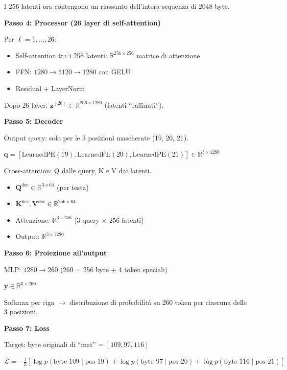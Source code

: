 \documentclass[12pt,a4paper]{article}
\begin{document}
\begin{examplebox}
I 256 latenti ora contengono un riassunto dell'intera sequenza di 2048 byte.

\textbf{Passo 4: Processor (26 layer di self-attention)}

Per $\ell = 1, \ldots, 26$:
\begin{itemize}
    \item Self-attention tra i 256 latenti: $\mathbb{R}^{256 \times 256}$ matrice di attenzione
    \item FFN: $1280 \to 5120 \to 1280$ con GELU
    \item Residual + LayerNorm
\end{itemize}

Dopo 26 layer: $\mathbf{z}^{(26)} \in \mathbb{R}^{256 \times 1280}$ (latenti ``raffinati'').

\textbf{Passo 5: Decoder}

Output query: solo per le 3 posizioni mascherate (19, 20, 21).

$\mathbf{q} = [\text{LearnedPE}(19), \text{LearnedPE}(20), \text{LearnedPE}(21)] \in \mathbb{R}^{3 \times 1280}$

Cross-attention: Q dalle query, K e V dai latenti.
\begin{itemize}
    \item $\mathbf{Q}^{\text{dec}} \in \mathbb{R}^{3 \times 64}$ (per testa)
    \item $\mathbf{K}^{\text{dec}}, \mathbf{V}^{\text{dec}} \in \mathbb{R}^{256 \times 64}$
    \item Attenzione: $\mathbb{R}^{3 \times 256}$ (3 query $\times$ 256 latenti)
    \item Output: $\mathbb{R}^{3 \times 1280}$
\end{itemize}

\textbf{Passo 6: Proiezione all'output}

MLP: $1280 \to 260$ (260 = 256 byte + 4 token speciali)

$\mathbf{y} \in \mathbb{R}^{3 \times 260}$

Softmax per riga $\to$ distribuzione di probabilit\`a su 260 token per ciascuna delle 3 posizioni.

\textbf{Passo 7: Loss}

Target: byte originali di ``mat'' = $[109, 97, 116]$

$\mathcal{L} = -\frac{1}{3}\left[\log p(\text{byte } 109 \mid \text{pos } 19) + \log p(\text{byte } 97 \mid \text{pos } 20) + \log p(\text{byte } 116 \mid \text{pos } 21)\right]$
\end{examplebox}
\end{document}
